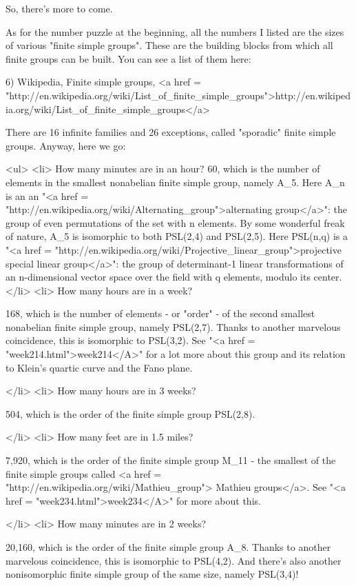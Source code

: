 So, there's more to come.

As for the number puzzle at the beginning, all the numbers I listed
are the sizes of various "finite simple groups".  These
are the building blocks from which all finite groups can be built.
You can see a list of them here:

6) Wikipedia, Finite simple groups, 
<a href = "http://en.wikipedia.org/wiki/List_of_finite_simple_groups">http://en.wikipedia.org/wiki/List_of_finite_simple_groups</a>

There are 16 infinite families and 26 exceptions, called "sporadic"
finite simple groups.  Anyway, here we go:

<ul>
<li>
How many minutes are in an hour? 
60, which is the number of elements in the smallest nonabelian finite
simple group, namely A_{5}.  Here A_{n} is an an
"<a href =
"http://en.wikipedia.org/wiki/Alternating_group">alternating
group</a>": the group of even permutations of the set with n
elements.  By some wonderful freak of nature, A_{5} is
isomorphic to both PSL(2,4) and PSL(2,5).  Here PSL(n,q) is a "<a
href =
"http://en.wikipedia.org/wiki/Projective_linear_group">projective
special linear group</a>": the group of determinant-1 linear
transformations of an n-dimensional vector space over the field with q
elements, modulo its center.
</li>
<li>
How many hours are in a week?  

168, which is the number of elements - or "order" - of the second
smallest nonabelian finite simple group, namely PSL(2,7).  Thanks to
another marvelous coincidence, this is isomorphic to PSL(3,2).  See
"<a href = "week214.html">week214</A>" for a lot more about this group and its relation to Klein's
quartic curve and the Fano plane.

</li>
<li>
How many hours are in 3 weeks?  

504, which is the order of the finite simple group PSL(2,8).

</li>
<li>
How many feet are in 1.5 miles?  

7,920, which is the order of the finite simple group M_{11} - the
smallest of the finite simple groups called <a href =
"http://en.wikipedia.org/wiki/Mathieu_group"> Mathieu groups</a>.  See
"<a href = "week234.html">week234</A>" for more about this.

</li>
<li>
How many minutes are in 2 weeks?   

20,160, which is the order of the finite simple group A_{8}.
Thanks to another marvelous coincidence, this is isomorphic to
PSL(4,2).  And there's also another nonisomorphic finite simple group
of the same size, namely PSL(3,4)!

